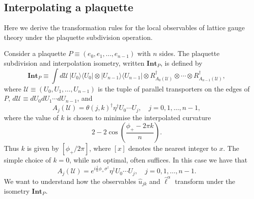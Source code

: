 \documentclass[12pt]{amsart}
\def\CAv{\mathbf{Int}}
\theoremstyle{definition}
\theoremstyle{remark}
\numberwithin{equation}{section}
\begin{document}
\subsection{Interpolating a plaquette}
Here we derive the transformation rules for the local observables of lattice gauge theory under the plaquette subdivision operation.

Consider a plaquette $P \equiv (e_0, e_1, \ldots, e_{n-1})$ with $n$ sides. The plaquette subdivision and interpolation isometry, written $\CAv_P$, is defined by
\begin{equation}
	\CAv_P \equiv \int d\mathcal{U}\, |U_0\rangle \langle U_0|\otimes |U_{n-1}\rangle \langle U_{n-1}| \otimes R_{A_0(\mathcal{U})}^\dag\otimes \cdots \otimes R^\dag_{A_{n-1}(\mathcal{U})},
\end{equation}
where $\mathcal{U} \equiv (U_0, U_1, \ldots, U_{n-1})$ is the tuple of parallel transporters on the edges of $P$, $d\mathcal{U} \equiv dU_{0}dU_{1} \cdots dU_{n-1}$, and 
\begin{equation}
	A_j(\mathcal{U}) = \theta(j,k)^\dag \eta^\dag U_0 \cdots U_{j}, \quad j = 0, 1, \ldots, n-1,
\end{equation}
where the value of $k$ is chosen to minimise the interpolated curvature
\begin{equation}
	2-2 \cos\left(\frac{\phi_+ - 2\pi k}{n}\right).
\end{equation}
Thus $k$ is given by $[\phi_+/2\pi]$, where $[x]$ denotes the nearest integer to $x$. The simple choice of $k=0$, while not optimal, often suffices. In this case we have that
\begin{equation}
	A_j(\mathcal{U}) = e^{i\frac{j}{n}\phi_+\sigma^z}\eta^\dag U_0 \cdots U_{j}, \quad j = 0, 1, \ldots, n-1.
\end{equation}
We want to understand how the observables $\widehat{u}_{jk}$ and $\widehat{\ell}^\alpha$ transform under the isometry $\CAv_P$.
\end{document}
